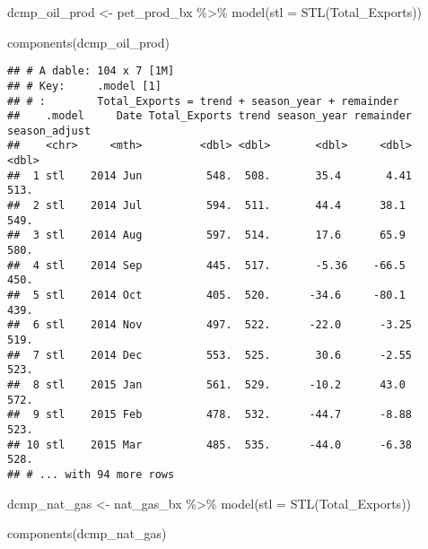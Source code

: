 \documentclass[
]{article}
\newenvironment{Shaded}{\begin{snugshade}}{\end{snugshade}}
\newcommand{\AttributeTok}[1]{\textcolor[rgb]{0.77,0.63,0.00}{#1}}
\newcommand{\FunctionTok}[1]{\textcolor[rgb]{0.00,0.00,0.00}{#1}}
\newcommand{\NormalTok}[1]{#1}
\newcommand{\OtherTok}[1]{\textcolor[rgb]{0.56,0.35,0.01}{#1}}
\newcommand{\SpecialCharTok}[1]{\textcolor[rgb]{0.00,0.00,0.00}{#1}}
\begin{document}
\begin{Shaded}
\begin{Highlighting}[]
\NormalTok{dcmp\_oil\_prod }\OtherTok{\textless{}{-}}\NormalTok{ pet\_prod\_bx }\SpecialCharTok{\%\textgreater{}\%}
  \FunctionTok{model}\NormalTok{(}\AttributeTok{stl =} \FunctionTok{STL}\NormalTok{(Total\_Exports))}

\FunctionTok{components}\NormalTok{(dcmp\_oil\_prod)}
\end{Highlighting}
\end{Shaded}

\begin{verbatim}
## # A dable: 104 x 7 [1M]
## # Key:     .model [1]
## # :        Total_Exports = trend + season_year + remainder
##    .model     Date Total_Exports trend season_year remainder season_adjust
##    <chr>     <mth>         <dbl> <dbl>       <dbl>     <dbl>         <dbl>
##  1 stl    2014 Jun          548.  508.       35.4       4.41          513.
##  2 stl    2014 Jul          594.  511.       44.4      38.1           549.
##  3 stl    2014 Aug          597.  514.       17.6      65.9           580.
##  4 stl    2014 Sep          445.  517.       -5.36    -66.5           450.
##  5 stl    2014 Oct          405.  520.      -34.6     -80.1           439.
##  6 stl    2014 Nov          497.  522.      -22.0      -3.25          519.
##  7 stl    2014 Dec          553.  525.       30.6      -2.55          523.
##  8 stl    2015 Jan          561.  529.      -10.2      43.0           572.
##  9 stl    2015 Feb          478.  532.      -44.7      -8.88          523.
## 10 stl    2015 Mar          485.  535.      -44.0      -6.38          528.
## # ... with 94 more rows
\end{verbatim}

\begin{Shaded}
\begin{Highlighting}[]
\NormalTok{dcmp\_nat\_gas }\OtherTok{\textless{}{-}}\NormalTok{ nat\_gas\_bx }\SpecialCharTok{\%\textgreater{}\%}
  \FunctionTok{model}\NormalTok{(}\AttributeTok{stl =} \FunctionTok{STL}\NormalTok{(Total\_Exports))}

\FunctionTok{components}\NormalTok{(dcmp\_nat\_gas)}
\end{Highlighting}
\end{Shaded}
\end{document}
